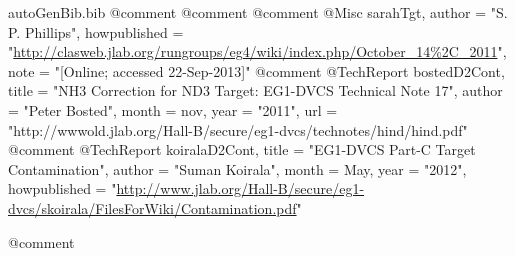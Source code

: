 \begin{filecontents*}{autoGenBib.bib}
@comment %
@comment %
@comment %
@Misc{ sarahTgt,
  author = "S. P. Phillips",
  howpublished = "\url{http://clasweb.jlab.org/rungroups/eg4/wiki/index.php/October\_14\%2C\_2011}", 
  note = "[Online; accessed 22-Sep-2013]"
} 
@comment %
@TechReport{ bostedD2Cont,
	title = "NH3 Correction for ND3 Target: EG1-DVCS Technical Note 17",
	author = "Peter Bosted",
	month = nov,
	year = "2011",
	url = "http://wwwold.jlab.org/Hall-B/secure/eg1-dvcs/technotes/hind/hind.pdf"
}
@comment %
@TechReport{ koiralaD2Cont,
	title = "{EG1-DVCS Part-C Target Contamination}",
	author = "Suman Koirala",
	month = May,
	year = "2012",
	howpublished = "\url{http://www.jlab.org/Hall-B/secure/eg1-dvcs/skoirala/FilesForWiki/Contamination.pdf}"
}

@comment %




\end{filecontents*}
